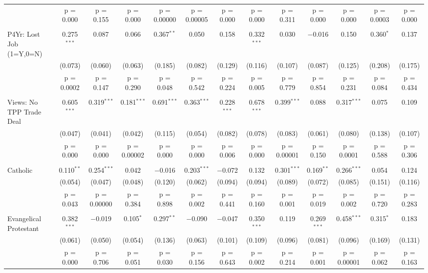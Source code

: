 \documentclass{article}
\begin{document}
\begin{landscape}
\begin{longtable}{@{\extracolsep{5pt}}lcccccccccccc}
  & p = 0.000 & p = 0.155 & p = 0.000 & p = 0.00000 & p = 0.00005 & p = 0.000 & p = 0.000 & p = 0.311 & p = 0.000 & p = 0.000 & p = 0.0003 & p = 0.000 \\ 
  & & & & & & & & & & & & \\ 
 P4Yr: Lost Job (1=Y,0=N) & 0.275$^{***}$ & 0.087 & 0.066 & 0.367$^{**}$ & 0.050 & 0.158 & 0.332$^{***}$ & 0.030 & $-$0.016 & 0.150 & 0.360$^{*}$ & 0.137 \\ 
  & (0.073) & (0.060) & (0.063) & (0.185) & (0.082) & (0.129) & (0.116) & (0.107) & (0.087) & (0.125) & (0.208) & (0.175) \\ 
  & p = 0.0002 & p = 0.147 & p = 0.290 & p = 0.048 & p = 0.542 & p = 0.224 & p = 0.005 & p = 0.779 & p = 0.854 & p = 0.231 & p = 0.084 & p = 0.434 \\ 
  & & & & & & & & & & & & \\ 
 Views: No TPP Trade Deal & 0.605$^{***}$ & 0.319$^{***}$ & 0.181$^{***}$ & 0.691$^{***}$ & 0.363$^{***}$ & 0.228$^{***}$ & 0.678$^{***}$ & 0.399$^{***}$ & 0.088 & 0.317$^{***}$ & 0.075 & 0.109 \\ 
  & (0.047) & (0.041) & (0.042) & (0.115) & (0.054) & (0.082) & (0.078) & (0.083) & (0.061) & (0.080) & (0.138) & (0.107) \\ 
  & p = 0.000 & p = 0.000 & p = 0.00002 & p = 0.000 & p = 0.000 & p = 0.006 & p = 0.000 & p = 0.00001 & p = 0.150 & p = 0.0001 & p = 0.588 & p = 0.306 \\ 
  & & & & & & & & & & & & \\ 
 Catholic & 0.110$^{**}$ & 0.254$^{***}$ & 0.042 & $-$0.016 & 0.203$^{***}$ & $-$0.072 & 0.132 & 0.301$^{***}$ & 0.169$^{**}$ & 0.266$^{***}$ & 0.054 & 0.124 \\ 
  & (0.054) & (0.047) & (0.048) & (0.120) & (0.062) & (0.094) & (0.094) & (0.089) & (0.072) & (0.085) & (0.151) & (0.116) \\ 
  & p = 0.043 & p = 0.00000 & p = 0.384 & p = 0.898 & p = 0.002 & p = 0.441 & p = 0.160 & p = 0.001 & p = 0.019 & p = 0.002 & p = 0.720 & p = 0.283 \\ 
  & & & & & & & & & & & & \\ 
 Evangelical Protestant & 0.382$^{***}$ & $-$0.019 & 0.105$^{*}$ & 0.297$^{**}$ & $-$0.090 & $-$0.047 & 0.350$^{***}$ & 0.119 & 0.269$^{***}$ & 0.458$^{***}$ & 0.315$^{*}$ & 0.183 \\ 
  & (0.061) & (0.050) & (0.054) & (0.136) & (0.063) & (0.101) & (0.109) & (0.096) & (0.081) & (0.096) & (0.169) & (0.131) \\ 
  & p = 0.000 & p = 0.706 & p = 0.051 & p = 0.030 & p = 0.156 & p = 0.643 & p = 0.002 & p = 0.214 & p = 0.001 & p = 0.00001 & p = 0.062 & p = 0.163 \\ 

\end{longtable}
\end{landscape}
\end{document}
